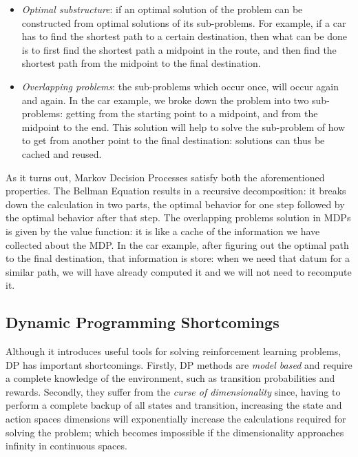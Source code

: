 \begin{itemize}
		\item \textit{Optimal substructure}: if an optimal solution of the problem can be constructed from optimal solutions of its sub-problems. For example, if a car has to find the shortest path to a certain destination, then what can be done is to first find the shortest path a midpoint in the route, and then find the shortest path from the midpoint to the final destination.
		\item \textit{Overlapping problems}: the sub-problems which occur once, will occur again and again. In the car example, we broke down the problem into two sub-problems: getting from the starting point to a midpoint, and from the midpoint to the end. This solution will help to solve the sub-problem of how to get from another point to the final destination: solutions can thus be cached and reused.
\end{itemize}

As it turns out, Markov Decision Processes satisfy both the aforementioned properties. The Bellman Equation results in a recursive decomposition: it breaks down the calculation in two parts, the optimal behavior for one step followed by the optimal behavior after that step. The overlapping problems solution in MDPs is given by the value function: it is like a cache of the information we have collected about the MDP. In the car example, after figuring out the optimal path to the final destination, that information is store: when we need that datum for a similar path, we will have already computed it and we will not need to recompute it.

\subsection{Dynamic Programming Shortcomings}
Although it introduces useful tools for solving reinforcement learning problems, DP has important shortcomings. Firstly, DP methods are \textit{model based} and require a complete knowledge of the environment, such as transition probabilities and rewards. Secondly, they suffer from the \textit{curse of dimensionality} since, having to perform a complete backup of all states and transition, increasing the state and action spaces dimensions will exponentially increase the calculations required for solving the problem; which becomes impossible if the dimensionality approaches infinity in continuous spaces.

